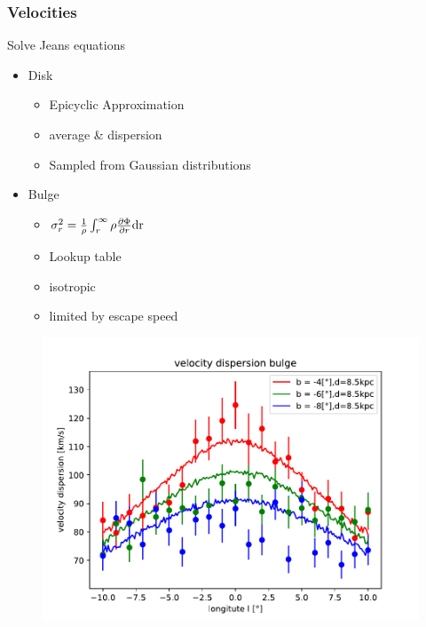 \documentclass{beamer}
\begin{document}
\begin{frame}
\frametitle{Velocities}

Solve Jeans equations

\begin{itemize}
\item Disk
	\begin{itemize}
	\item Epicyclic Approximation
	\item average \& dispersion
	\item Sampled from Gaussian distributions
	\end{itemize}
\item Bulge
	\begin{itemize}
	\item \(\sigma_r^2 = \frac{1}{\rho}\int_{r}^{\infty}\rho \frac{\partial \Phi}{\partial r}\textup{dr}\)
	\item Lookup table
	\item isotropic
	\item limited by escape speed
	\end{itemize}
\end{itemize}

\end{frame}

\begin{frame}
\begin{figure}
\centering
\includegraphics[width=\textwidth,height=\textheight,keepaspectratio]{Images/velocity_dispersion_bulge.pdf}
\end{figure}
\end{frame}
\end{document}
